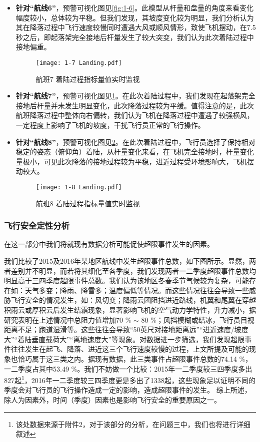 \documentclass{MathorCupModeling}
\begin{document}
\begin{itemize}
		\item \textbf{针对“航线6”}，预警可视化图见\textcolor{blue}{\cref{fig:1-6}}。此模型从杆量和盘量的角度来看变化幅度较小，总体较为平稳。但我们发现，其坡度变化较为明显，我们分析认为其在降落过程中飞行速度较慢同时遭遇大风或顺风情形，致使飞机摆动，在7.5秒之后，即起落架完全接地后杆量发生了较大突变，我们认为此次着陆过程中接地偏重。
		\begin{figure}[H]
			\centering
			\texttt{[image: 1-7 Landing.pdf]}
			\caption{航班7 着陆过程指标量值实时监视}
			\label{fig:1-7}
		\end{figure}
		\item \textbf{针对“航线7”}，预警可视化图见\textcolor{blue}{\cref{fig:1-7}}。在此次着陆过程中，我们发现在起落架完全接地后杆量并未发生明显变化，此次降落过程较为平缓。值得注意的是，此次航班降落过程中整体向右偏转，我们认为飞机在降落过程中遭遇了较强横风，一定程度上影响了飞机的坡度，干扰飞行员正常的飞行操作。

		\item \textbf{针对“航线8”}，预警可视化图见\textcolor{blue}{\cref{fig:1-8}}。在此次着陆过程中，飞行员选择了保持相对稳定的姿态（俯仰角）着陆，从杆量变化来看，在飞机完全接地时，杆量变化量极小，可见此次降落的接地过程较为平稳，进近过程受环境影响大，飞机摆动较大。
		\begin{figure}[H]
			\centering
			\texttt{[image: 1-8 Landing.pdf]}
			\caption{航班8 着陆过程指标量值实时监视}
			\label{fig:1-8}
		\end{figure}
	\end{itemize}
\subsubsection{飞行安全定性分析}
在这一部分中我们将就现有数据分析可能促使超限事件发生的因素。

我们比较了2015及2016年某地区航线中发生超限事件总数，如下图所示。显然，两者差别并不明显，而若将其细化至各季度，我们发现两者一二季度超限事件总数均明显高于三四季度超限事件总数。我们认为该地区冬春季节气候较为复杂，可能存在如：天气多变；降雨、降雪多；温度偏低等情况。而这些情况往往会导致一些威胁飞行安全的情况发生，如：风切变；降雨云团阻挡进近路线，机翼和尾翼在穿越积雨云或厚积云后发生结霜现象，显著影响飞机的空气动力学特性，升力减小，据研究表明在上述情况中总阻力值增加70 \% $\sim$ 80 \%；风挡模糊或结冰，飞行员目视距离不足；跑道湿滑等。这些往往会导致“50英尺对接地距离远”“进近速度/坡度大”“着陆垂直载荷大”“离地速度大”等现象。对数据进一步筛选，我们发现超限事件往往发生在起飞、降落、进近这三个飞行速度较慢的过程，上文所提及可能的现象也恰巧属于这三类之内。据现有数据，此三类事件占超限事件总数的74.14 \%，一二季度占其中53.49 \%。我们不妨做一个比较：2015年一二季度较三四季度多出827起\textcolor{blue}{\footnote{该处数据来源于附件2，对于该部分的分析，在问题三中，我们也将进行详细叙述}}，2016年一二季度较三四季度更是多出了1338起，这些现象足以证明不同的季度会对飞行员的飞行操作造成一定的影响，造成超限事件的发生。
综上所述，除人为因素外，时间（季度）因素也是影响飞行安全的重要原因之一。
\end{document}
